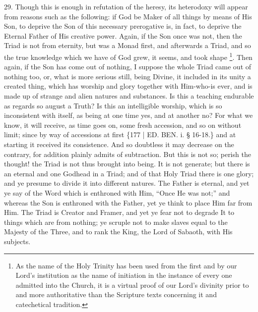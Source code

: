 29. Though this is enough in
refutation of the heresy, its heterodoxy will appear from reasons such
as the following: if God be Maker of all things by means of His Son,
to deprive the Son of this necessary prerogative is, in fact, to
deprive the Eternal Father of His creative power. Again, if the Son
once was not, then the Triad is not from eternity, but was a Monad
first, and afterwards a Triad, and so the true knowledge which we have
of God grew, it seems, and took shape \footnote{As the name of the Holy Trinity has been used from the first and by
our Lord's institution as the name of initiation in the instance of
every one admitted into the Church, it is a virtual proof of our Lord's
divinity prior to and more authoritative than the Scripture texts
concerning it and catechetical tradition.}. Then again, if the Son has come out of nothing, I suppose the
whole Triad came out of nothing too, or, what is more serious still,
being Divine, it included in its unity a created thing, which has
worship and glory together with Him-who-is ever, and is made up of
strange and alien natures and substances. Is this a teaching endurable
as regards so august a Truth? Is this an intelligible worship, which
is so inconsistent with itself, as being at one time yes, and at
another no? For what we know, it will receive, as time goes on, some
fresh accession, and so on without limit; since by way of accessions
at first \{177 | ED.
BEN. i. § 16-18.\} and at starting it received
its consistence. And so doubtless it may decrease on the contrary, for
addition plainly admits of subtraction. But this is not so; perish the
thought! the Triad is not thus brought into being. It is not generate;
but there is an eternal and one Godhead in a Triad; and of that Holy
Triad there is one glory; and ye presume to divide it into different
natures. The Father is eternal, and yet ye say of the Word which is
enthroned with Him, ``Once He was not;'' and whereas the Son is
enthroned with the Father, yet ye think to place Him far from Him. The
Triad is Creator and Framer, and yet ye fear not to degrade It to
things which are from nothing; ye scruple not to make slaves equal to
the Majesty of the Three, and to rank the King, the Lord of Sabaoth,
with His subjects.

